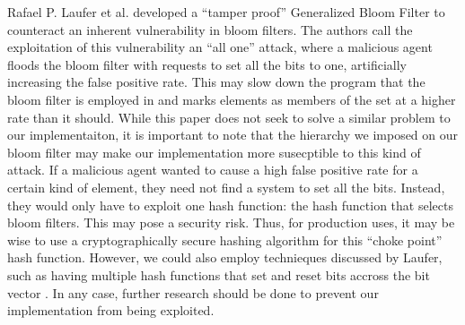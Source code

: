 Rafael P. Laufer et al. developed a ``tamper proof'' Generalized Bloom Filter \cite{Laufer2007GeneralizedBF} to counteract an inherent vulnerability in bloom filters.
The authors call the exploitation of this vulnerability an ``all one'' attack, where a malicious agent floods the bloom filter with requests to set all the bits to one, artificially increasing the false positive rate.
This may slow down the program that the bloom filter is employed in and marks elements as members of the set at a higher rate than it should.
While this paper does not seek to solve a similar problem to our implementaiton, it is important to note that the hierarchy we imposed on our bloom filter
may make our implementation more susecptible to this kind of attack. If a malicious agent wanted to cause a high false positive rate for a certain kind of element, they need not find a system to set all the bits.
Instead, they would only have to exploit one hash function: the hash function that selects bloom filters. 
This may pose a security risk.
Thus, for production uses, it may be wise to use a cryptographically secure hashing algorithm for this ``choke point'' hash function.
However, we could also employ technieques discussed by Laufer, such as having multiple hash functions that set and reset bits accross the bit vector \cite{Laufer2007GeneralizedBF}.
In any case, further research should be done to prevent our implementation from being exploited.